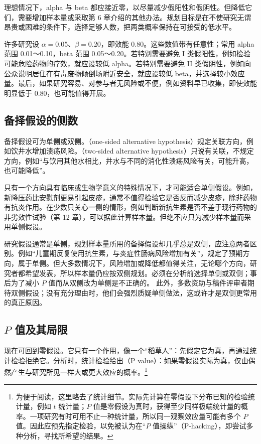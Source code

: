 理想情况下，alpha 与 beta 都应接近零，以尽量减少假阳性和假阴性。但降低它们，需要增加样本量或采取第 6 章介绍的其他办法。规划目标是在不使研究无谓昂贵或困难的条件下，选择足够人数，把两类概率保持在可接受的低水平。

许多研究设 $\alpha=0.05$、$\beta=0.20$，即效能 0.80。这些数值带有任意性；常用 alpha 范围 0.01～0.10，beta 范围 0.05～0.20。若特别需要避免 I 类假阳性，例如检验可能危险药物的疗效，就应设较低 alpha。若特别需要避免 II 类假阴性，例如向公众说明居住在有毒废物倾倒场附近安全，就应设较低 beta，并选择较小效应量。最后，如果研究容易、对参与者无风险或不便，例如资料早已收集，即使效能明显低于 0.80，也可能值得开展。

\subsection{备择假设的侧数}
备择假设可为单侧或双侧。（one-sided alternative hypothesis）规定关联方向，例如饮井水增加溃疡风险。（two-sided alternative hypothesis）只说有关联，不规定方向，例如“与饮用其他水相比，井水与不同的消化性溃疡风险有关，可能升高，也可能降低”。

只有一个方向具有临床或生物学意义的特殊情况下，才可能适合单侧假设。例如，新降压药比安慰剂更易引起皮疹，通常不值得检验它是否反而减少皮疹，除非药物有抗炎作用。在少数只关心一侧的情形，例如判断新抗生素是否不差于现行药物的非劣效性试验（第 12 章），可以据此计算样本量。但绝不应只为减少样本量而采用单侧假设。

研究假设通常是单侧，规划样本量所用的备择假设却几乎总是双侧，应注意两者区别。例如“儿童期反复使用抗生素，与炎症性肠病风险增加有关”，规定了预期方向，属于单侧。但大多数情况下，风险增加或降低都值得关注，无论哪个方向，研究者都希望发表，所以样本量仍应按双侧规划。必须在分析前选择单侧或双侧；事后为了减小 $P$ 值而从双侧改为单侧是不正确的。
此外，多数资助与稿件评审者期待双侧假设；没有充分理由时，他们会强烈质疑单侧做法，这或许才是双侧更常用的真正原因。

\subsection{\texorpdfstring{$P$}{P} 值及其局限}
现在可回到零假设。它只有一个作用，像一个“稻草人”：先假定它为真，再通过统计检验拒绝它。分析时，统计检验给出（P value）：如果零假设实际为真，仅由偶然产生与研究所见一样大或更大效应的概率。\footnote{为便于阅读，这里略去了统计细节。实际先计算在零假设下分布已知的检验统计量，例如 $t$ 统计量；$P$ 值是零假设为真时，获得至少同样极端统计量的概率。一项研究有时可用不止一种统计量，所以同一观察效应量可能有多个 $P$ 值。因此应预先指定检验，以免被认为在“$P$ 值操纵”（P-hacking），即尝试多种分析，寻找所希望的结果。}

